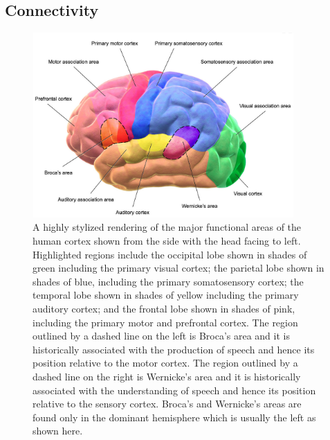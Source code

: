 \documentclass[letterpaper,11pt]{article}
\def\urlh#1{{}}
\begin{document}
\subsection{Connectivity}


\begin{figure}
%
  \begin{center} 
    \includegraphics[height=200pt]{./figures/Human_Brain_Neocortex_Function.jpg} 
  \end{center}
%
  \caption{A highly stylized rendering of the major functional areas of the human cortex shown from the side with the head facing to left. Highlighted regions include the occipital lobe shown in shades of green including the primary visual cortex; the parietal lobe shown in shades of blue, including the primary somatosensory cortex; the temporal lobe shown in shades of yellow including the primary auditory cortex; and the frontal lobe shown in shades of pink, including the primary motor and prefrontal cortex. The region outlined by a dashed line on the left is Broca's area and it is historically associated with the production of speech and hence its position relative to the motor cortex. The region outlined by a dashed line on the right is Wernicke’s area and it is historically associated with the understanding of speech and hence its position relative to the sensory cortex. Broca's and Wernicke's areas are found only in the dominant hemisphere which is usually the left as shown here.}
%
  \label{fig_necortex}
%
\end{figure}
\end{document}
